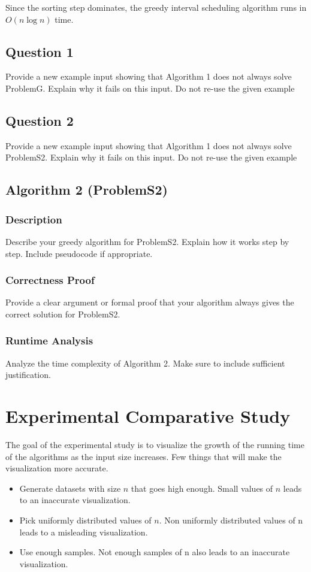 \documentclass{article}
\begin{document}
Since the sorting step dominates, the greedy interval scheduling algorithm runs in $O(n \log n)$ time.

\subsection{Question 1}
{\color{red} Provide a new example input showing that Algorithm 1 does not always solve ProblemG. Explain why it fails on this input. Do not re-use the given example}

\subsection{Question 2}
{\color{red} Provide a new example input showing that Algorithm 1 does not always solve ProblemS2. Explain why it fails on this input. Do not re-use the given example}

\subsection{Algorithm 2 (ProblemS2)}

\subsubsection{Description}
{\color{red} Describe your greedy algorithm for ProblemS2. Explain how it works step by step. Include pseudocode if appropriate.}

\subsubsection{Correctness Proof}
{\color{red} Provide a clear argument or formal proof that your algorithm always gives the correct solution for ProblemS2.}

\subsubsection{Runtime Analysis}
{\color{red} Analyze the time complexity of Algorithm 2. Make sure to include sufficient
justification.}

\section{Experimental Comparative Study}

{\color{red}The goal of the experimental study is to visualize the growth of the running time of the algorithms as the input size increases. Few things that will make the visualization more accurate.

\begin{itemize}
    \item Generate datasets with size $n$ that goes high enough. Small values of $n$ leads to an inaccurate visualization.
    \item Pick uniformly distributed values of $n$. Non uniformly distributed values of n leads to a misleading visualization.
    \item Use enough samples. Not enough samples of n also leads to an inaccurate visualization.
\end{itemize}
}
\end{document}
